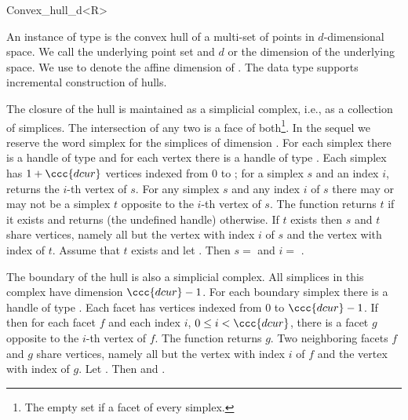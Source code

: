 
\begin{ccRefClass}{Convex_hull_d<R>}

\ccDefinition

An instance  of type  is the convex hull
of a multi-set  of points in $d$-dimensional space. We call
 the underlying point set and $d$ or  the dimension of
the underlying space. We use  to denote the affine dimension
of .  The data type supports incremental construction of hulls.

The closure of the hull is maintained as a simplicial complex, i.e.,
as a collection of simplices. The intersection of any two is a face of
both\footnote{The empty set if a facet of every simplex.}. In the
sequel we reserve the word simplex for the simplices of dimension
. For each simplex there is a handle of type
 and for each vertex there is a handle of type
.  Each simplex has $1 + \ccc{dcur}$ vertices
indexed from $0$ to ; for a simplex $s$ and an index $i$,
 returns the $i$-th vertex of $s$. For any simplex
$s$ and any index $i$ of $s$ there may or may not be a simplex $t$
opposite to the $i$-th vertex of $s$.  The function
 returns $t$ if it exists and returns
 (the undefined handle) otherwise. If $t$ exists
then $s$ and $t$ share  vertices, namely all but the vertex
with index $i$ of $s$ and the vertex with index
 of $t$. Assume that
$t$ exists and let .  Then $s =$
 and $i =$
.

The boundary of the hull is also a simplicial complex. All simplices
in this complex have dimension $\ccc{dcur} - 1$.  For each boundary
simplex there is a handle of type .  Each facet has
 vertices indexed from $0$ to $\ccc{dcur} - 1$. If  then for each facet $f$ and each index $i$, $0 \le i <
\ccc{dcur}$, there is a facet $g$ opposite to the $i$-th vertex of
$f$.  The function  returns $g$.  Two
neighboring facets $f$ and $g$ share  vertices, namely
all but the vertex with index $i$ of $f$ and the vertex with index
 of $g$.  Let . Then  and .



\end{ccRefClass}
